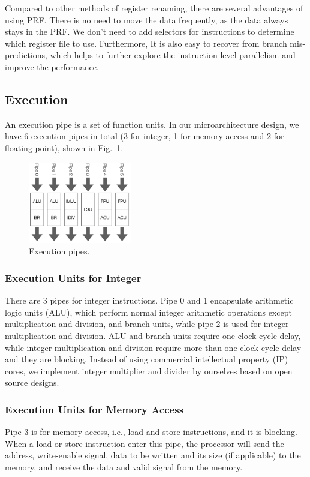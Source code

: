Compared to other methods of register renaming, there are several advantages of using PRF. There is no need to move the data frequently, as the data always stays in the PRF. We don't need to add selectors for instructions to determine which register file to use. Furthermore, It is also easy to recover from branch mis-predictions, which helps to further explore the instruction level parallelism and improve the performance.

\subsection{Execution} %

An execution pipe is a set of function units. In our microarchitecture design, we have 6 execution pipes in total (3 for integer, 1 for memory access and 2 for floating point), shown in Fig.~\ref{fig:pipe}.

\begin{figure}[!htp]
    \centering
    \includegraphics[width=0.4\textwidth]{figure/pipe.png}
    \caption{Execution pipes.}
    \label{fig:pipe}
\end{figure}

\subsubsection{Execution Units for Integer} %
There are 3 pipes for integer instructions. Pipe 0 and 1 encapsulate arithmetic logic units (ALU), which perform normal integer arithmetic operations except multiplication and division, and branch units, while pipe 2 is used for integer multiplication and division. ALU and branch units require one clock cycle delay, while integer multiplication and division require more than one clock cycle delay and they are blocking. Instead of using commercial intellectual property (IP) cores, we implement integer multiplier and divider by ourselves based on open source designs.

\subsubsection{Execution Units for Memory Access} %
Pipe 3 is for memory access, i.e., load and store instructions, and it is blocking. When a load or store instruction enter this pipe, the processor will send the address, write-enable signal, data to be written and its size (if applicable) to the memory, and receive the data and valid signal from the memory.

